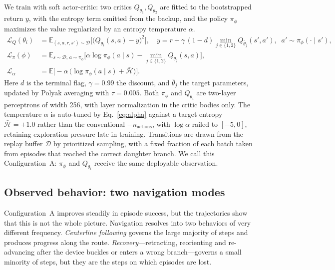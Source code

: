 We train with soft actor-critic: two critics $Q_{\theta_1}, Q_{\theta_2}$ are fitted to the
bootstrapped return $y$, with the entropy term omitted from the backup, and the policy
$\pi_{\phi}$ maximizes the value regularized by an entropy temperature $\alpha$.
%
\begin{align}
\mathcal{L}_{Q}(\theta_i) &= \mathbb{E}_{(s,a,r,s')\sim\mathcal{D}}
   \Big[\big(Q_{\theta_i}(s,a) - y\big)^{2}\Big],
   \quad
   y = r + \gamma\,(1-d)\min_{j\in\{1,2\}} Q_{\bar{\theta}_j}(s',a'),
   \;\; a'\sim\pi_{\phi}(\cdot\mid s'),
   \label{eq:critic}\\[2pt]
\mathcal{L}_{\pi}(\phi) &= \mathbb{E}_{s\sim\mathcal{D},\, a\sim\pi_{\phi}}
   \Big[\alpha\log\pi_{\phi}(a\mid s) - \min_{j\in\{1,2\}} Q_{\theta_j}(s,a)\Big],
   \label{eq:actor}\\[2pt]
\mathcal{L}_{\alpha} &= \mathbb{E}\big[-\alpha\,\big(\log\pi_{\phi}(a\mid s) + \bar{\mathcal{H}}\big)\big].
   \label{eq:alpha}
\end{align}
%
Here $d$ is the terminal flag, $\gamma = 0.99$ the discount, and $\bar{\theta}_j$ the target
parameters, updated by Polyak averaging with $\tau = 0.005$. Both $\pi_{\phi}$ and $Q_{\theta_i}$
are two-layer perceptrons of width 256, with layer normalization in the critic bodies only. The
temperature $\alpha$ is auto-tuned by Eq.~\eqref{eq:alpha} against a target entropy
$\bar{\mathcal{H}} = +1.0$ rather than the conventional $-n_{\mathrm{actions}}$, with
$\log\alpha$ railed to $[-5,0]$, retaining exploration pressure late in training. Transitions are
drawn from the replay buffer $\mathcal{D}$ by prioritized sampling, with a fixed fraction of each
batch taken from episodes that reached the correct daughter branch. We call this
Configuration~A: $\pi_{\phi}$ and $Q_{\theta_i}$ receive the same deployable observation.

\subsection{Observed behavior: two navigation modes}
\label{sec:behavior}

Configuration~A improves steadily in episode success, but the trajectories show that this is not
the whole picture. Navigation resolves into two behaviors of very different frequency.
\emph{Centerline following} governs the large majority of steps and produces progress along the
route. \emph{Recovery}---retracting, reorienting and re-advancing after the device buckles or
enters a wrong branch---governs a small minority of steps, but they are the steps on which
episodes are lost.

